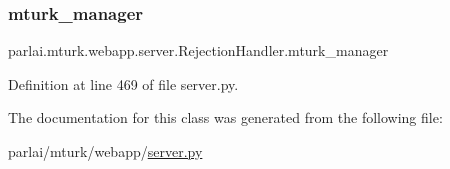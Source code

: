 \subsubsection{\texorpdfstring{mturk\+\_\+manager}{mturk\_manager}}
{\footnotesize\ttfamily parlai.\+mturk.\+webapp.\+server.\+Rejection\+Handler.\+mturk\+\_\+manager}



Definition at line 469 of file server.\+py.



The documentation for this class was generated from the following file\+:\begin{DoxyCompactItemize}
\item 
parlai/mturk/webapp/\hyperlink{server_8py}{server.\+py}\end{DoxyCompactItemize}
